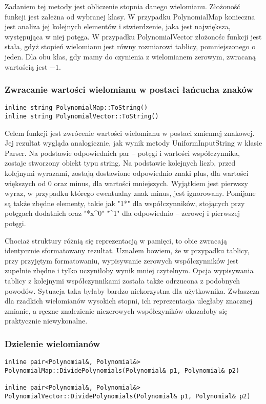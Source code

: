 \documentclass[twoside,a4paper]{book}
\begin{document}
Zadaniem tej metody jest obliczenie stopnia danego wielomianu. Złożoność funkcji jest zależna od wybranej klasy. W przypadku PolynomialMap konieczna jest analiza jej kolejnych elementów i stwierdzenie, jaka jest największa, występująca w niej potęga. W przypadku PolynomialVector złożonośc funkcji jest stała, gdyż stopień wielomianu jest równy rozmiarowi tablicy, pomniejszonego o jeden. Dla obu klas, gdy mamy do czynienia z wielomianem zerowym, zwracaną wartością jest $-1$.
\\

\subsubsection{Zwracanie wartości wielomianu w postaci łańcucha znaków}
\begin{lstlisting}
inline string PolynomialMap::ToString()
inline string PolynomialVector::ToString()
\end{lstlisting}

Celem funkcji jest zwrócenie wartości wielomianu w postaci zmiennej znakowej. Jej rezultat wygląda analogicznie, jak wynik metody UniformInputString w klasie Parser. Na podstawie odpowiednich par – potęgi i wartości współczynnika, zostaje stworzony obiekt typu string. Na podstawie kolejnych liczb, przed kolejnymi wyrazami, zostają dostawione odpowiednio znaki plus, dla wartości większych od $0$ oraz minus, dla wartości mniejszych. Wyjątkiem jest pierwszy wyraz, w przypadku którego ewentualny znak minus, jest ignorowany. Pomijane są także zbędne elementy, takie jak "1*" dla współczynników, stojących przy potęgach dodatnich oraz "*x\^{}0" "\^{}1" dla odpowiednio – zerowej i pierwszej potęgi.

Chociaż struktury różnią się reprezentacją w pamięci, to obie zwracają identycznie sformatowany rezultat. Uznałem bowiem, że w przypadku tablicy, przy przyjętym formatowaniu, wypisywanie zerowych współczynników jest zupełnie zbędne i tylko uczyniłoby wynik mniej czytelnym. Opcja wypisywania tablicy z kolejnymi współczynnikami została także odrzucona z podobnych powodów. Sytuacja taka byłaby bardzo niekorzystna dla użytkownika. Zwłaszcza dla rzadkich wielomianów wysokich stopni, ich reprezentacja uległaby znacznej zmianie, a ręczne znalezienie niezerowych współczyników okazałoby się praktycznie niewykonalne. 
\\

\subsubsection{Dzielenie wielomianów}
\begin{lstlisting}
inline pair<Polynomial&, Polynomial&>
PolynomialMap::DividePolynomials(Polynomial& p1, Polynomial& p2)

inline pair<Polynomial&, Polynomial&>
PolynomialVector::DividePolynomials(Polynomial& p1, Polynomial& p2)
\end{lstlisting}
\end{document}
